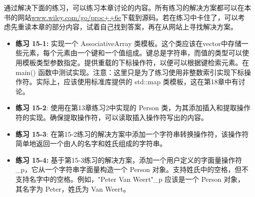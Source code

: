 通过解决下面的练习，可以练习本章讨论的内容。所有练习的解决方案都可以在本书的网站\url{www.wiley.com/go/proc++6e}下载到源码。若在练习中卡住了，可以考虑先重读本章的部分内容，试着自己找到答案，再在从网站上寻找解决方案。

\begin{itemize}
\item
\textbf{练习 15-1:} 实现一个 AssociativeArray 类模板。这个类应该在vector中存储一些元素，每个元素由一个键和一个值组成。键总是字符串，而值的类型可以使用模板类型参数指定。提供重载的下标操作符，以便可以根据键检索元素。在 main() 函数中测试实现。注意：这里只是为了练习使用非整数索引实现下标操作符。实际上，应该使用标准库提供的 std::map 类模板，这在第18章中有讨论。

\item
\textbf{练习 15-2}: 使用在第13章练习2中实现的 Person 类，为其添加插入和提取操作符的实现。确保提取操作符，可以读取插入操作符写出的内容。

\item
\textbf{练习 15-3}: 在第15-2练习的解决方案中添加一个字符串转换操作符，该操作符简单地返回一个由人的名字和姓氏组成的字符串。

\item
\textbf{练习 15-4:} 基于第15-3练习的解决方案，添加一个用户定义的字面量操作符 \_p，它从一个字符串字面量构造一个 Person 对象。支持姓氏中的空格，但不支持名字中的空格。例如，"Peter Van Weert"\_p 应该是一个 Person 对象，其名字为 Peter，姓氏为 Van Weert。
\end{itemize}













